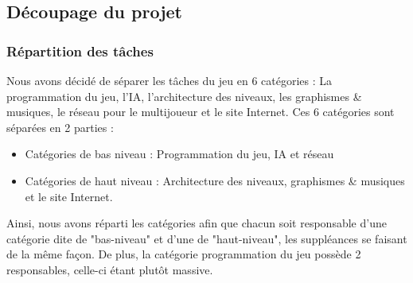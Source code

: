 \documentclass{article}
\begin{document}
\subsection{Découpage du projet}


\subsubsection{Répartition des tâches}

Nous avons décidé de séparer les tâches du jeu en 6 catégories : La programmation du jeu, l'IA, l'architecture des niveaux, les graphismes \& musiques, le réseau pour le multijoueur et le site Internet.
Ces 6 catégories sont séparées en 2 parties :

\begin{itemize}
    \item Catégories de bas niveau : Programmation du jeu, IA et réseau
    \item Catégories de haut niveau : Architecture des niveaux, graphismes \& musiques et le site Internet.
\end{itemize}

Ainsi, nous avons réparti les catégories afin que chacun soit responsable d'une catégorie dite de "bas-niveau" et d'une de "haut-niveau", les suppléances se faisant de la même façon. De plus, la catégorie programmation du jeu possède 2 responsables, celle-ci étant plutôt massive. \\
\end{document}
